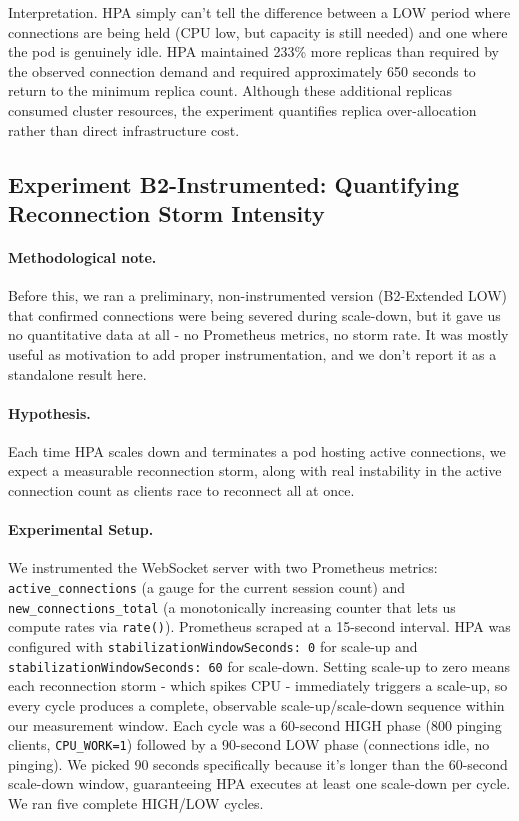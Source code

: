 \documentclass[twocolumn]{svjour3}
\begin{document}
Interpretation. HPA simply can't tell the difference between a
LOW period where connections are being held (CPU low, but capacity is still
needed) and one where the pod is genuinely idle. HPA maintained 233\% more replicas than required by the observed connection demand and required approximately 650 seconds to return to the minimum replica count. Although these additional replicas consumed cluster resources, the experiment quantifies replica over-allocation rather than direct infrastructure cost.

\subsection{Experiment B2-Instrumented: Quantifying Reconnection Storm Intensity}

\paragraph{Methodological note.}
Before this, we ran a preliminary, non-instrumented version (B2-Extended LOW) that
confirmed connections were being severed during scale-down, but it gave us no
quantitative data at all - no Prometheus metrics, no storm rate. It was mostly
useful as motivation to add proper instrumentation, and we don't report it as a
standalone result here.

\paragraph{Hypothesis.} Each time HPA scales down and terminates a pod hosting
active connections, we expect a measurable reconnection storm, along with real
instability in the active connection count as clients race to reconnect all at once.

\paragraph{Experimental Setup.} We instrumented the WebSocket server with two
Prometheus metrics: \texttt{active\_connections} (a gauge for the current session
count) and \texttt{new\_connections\_total} (a monotonically increasing counter
that lets us compute rates via \texttt{rate()}). Prometheus scraped at a
15-second interval. HPA was configured with \texttt{stabilizationWindowSeconds: 0}
for scale-up and \texttt{stabilizationWindowSeconds: 60} for scale-down. Setting
scale-up to zero means each reconnection storm - which spikes CPU - immediately
triggers a scale-up, so every cycle produces a complete, observable
scale-up/scale-down sequence within our measurement window. Each cycle was a
60-second HIGH phase (800 pinging clients, \texttt{CPU\_WORK=1}) followed by a
90-second LOW phase (connections idle, no pinging). We picked 90 seconds
specifically because it's longer than the 60-second scale-down window, guaranteeing
HPA executes at least one scale-down per cycle. We ran five complete HIGH/LOW
cycles.
\end{document}
